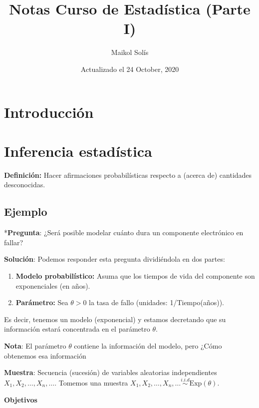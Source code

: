 \documentclass[
  12pt,
]{book}
\title{Notas Curso de Estadística (Parte I)}
\author{Maikol Solís}
\date{Actualizado el 24 October, 2020}
\providecommand{\tightlist}{%
  \setlength{\itemsep}{0pt}\setlength{\parskip}{0pt}}
\begin{document}
\maketitle

{
\hypersetup{linkcolor=}
\setcounter{tocdepth}{4}
\tableofcontents
}
\hypertarget{introducciuxf3n}{%
\chapter{Introducción}\label{introducciuxf3n}}

\hypertarget{inferencia-estaduxedstica}{%
\chapter{Inferencia estadística}\label{inferencia-estaduxedstica}}

\textbf{Definición:} Hacer afirmaciones probabilísticas respecto a (acerca de)
cantidades desconocidas.

\hypertarget{ejemplo}{%
\section{Ejemplo}\label{ejemplo}}

*\textbf{Pregunta}: ¿Será posible modelar cuánto dura un componente electrónico en
fallar?

\textbf{Solución}: Podemos responder esta pregunta dividiéndola en dos partes:

\begin{enumerate}
\def\labelenumi{\arabic{enumi}.}
\tightlist
\item
  \textbf{Modelo probabilístico:} Asuma que los tiempos de vida del componente son
  exponenciales (en años).
\item
  \textbf{Parámetro:} Sea \(\theta > 0\) la tasa de fallo (unidades: 1/Tiempo(años)).
\end{enumerate}

Es decir, tenemos un modelo (exponencial) y estamos decretando que su información estará concentrada en el parámetro \(\theta\).

\textbf{Nota}: El parámetro \(\theta\) contiene la información del modelo,
pero ¿Cómo obtenemos esa información

\textbf{Muestra}: Secuencia (sucesión) de variables aleatorias independientes \(X_1,X_2,\dots, X_n,\dots\). Tomemos una muestra \(X_1,X_2,\dots, X_n,\dots \stackrel{i.i.d}{\sim} \text{Exp}(\theta)\).

\textbf{Objetivos}
\end{document}
